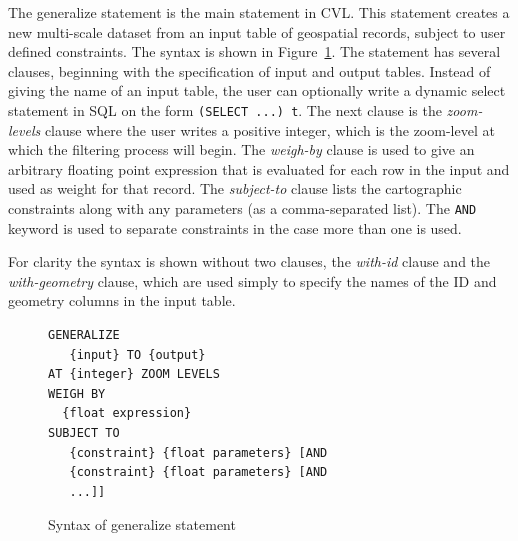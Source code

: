 The generalize statement is the main statement in CVL. This statement creates a new multi-scale dataset from an input table of geospatial records, subject to user defined constraints. The syntax is shown in Figure~\ref{fig:generalize:syntax}. The statement has several clauses, beginning with the specification of input and output tables. Instead of giving the name of an input table, the user can optionally write a dynamic select statement in SQL on the form \texttt{(SELECT ...) t}. The next clause is the \emph{zoom-levels} clause where the user writes a positive integer, which is the zoom-level  at which the filtering process will begin. The \emph{weigh-by} clause is used to give an arbitrary floating point expression that is evaluated for each row in the input and used as weight for that record. The \emph{subject-to} clause lists the cartographic constraints along with any parameters (as a comma-separated list). The \texttt{AND} keyword is used to separate constraints in the case more than one is used.

For clarity the syntax is shown without two clauses, the \emph{with-id} clause and the \emph{with-geometry} clause, which are used simply to specify the names of the ID and geometry columns in the input table.

\begin{figure}[htbp]
\begin{center}
\begin{lstlisting}
GENERALIZE 
   {input} TO {output}
AT {integer} ZOOM LEVELS
WEIGH BY
  {float expression}
SUBJECT TO 
   {constraint} {float parameters} [AND
   {constraint} {float parameters} [AND
   ...]]
\end{lstlisting}
\caption{Syntax of generalize statement}
\label{fig:generalize:syntax}
\end{center}
\end{figure}

